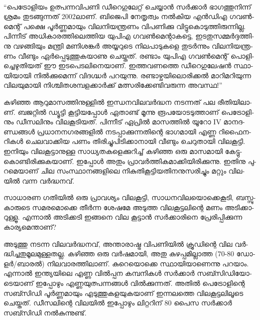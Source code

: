 \vskip 2pt

‌\begin{framed}
``പെ­ട്രോ­ളി­യം ഉത്പ­ന്ന­വി­പ­ണി ഡീ­റെ­ഗു­ലേ­റ്റ് ചെ­യ്യാന്‍ സര്‍­ക്കാര്‍ ഭാ­ഗ­ത്തു­നി­ന്ന് ശ്ര­മം തു­ട­ങ്ങു­ന്ന­ത് 2002­ലാ­ണ്. 
ബി­ജെ­പി നേ­തൃ­ത്വം നല്‍­കിയ എന്‍­ഡി­എ­ ഗവണ്‍­മെ­ന്റ് പക്ഷെ പൂര്‍­ണ്ണ­മാ­യും ­വി­ല­നി­യ­ന്ത്ര­ണം­ വി­പ­ണി­ക്കു 
വി­ട്ടു­കൊ­ടു­ത്തി­രു­ന്നി­ല്ല. പി­ന്നീ­ട് അധി­കാ­ര­ത്തി­ലെ­ത്തിയ ­യു­പി­എ­ ഗവണ്‍­മെ­ന്റാ­ക­ട്ടെ, ഇട­തു­സ­മ്മര്‍­ദ്ദ­ത്തി­നു വഴ­ങ്ങി­യും 
മന്ത്രി മണി­ശ­ങ്കര്‍ അയ്യ­റു­ടെ നി­ല­പാ­ടു­ക­ളെ തു­ടര്‍­ന്നും വി­ല­നി­യ­ന്ത്ര­ണം വീ­ണ്ടും ഏര്‍­പ്പെ­ടു­ത്തു­ക­യാ­ണു ചെ­യ്ത­ത്. രണ്ടാം 
യു­പിഎ ഗവണ്‍­മെ­ന്റ് പൊ­ളി­ച്ചെ­ഴു­തി­യ­ത് ഈ ഇട­പെ­ട­ലി­നെ­യാ­ണ്. ഇത്ത­വ­ണ­ത്തെ ഡീ­റെ­ഗു­ലേ­ഷന്‍ സ്ഥാ­യി­യാ­യി
നില്‍­ക്കു­മെ­ന്ന് വി­ദ­ഗ്ദ്ധര്‍ പറ­യു­ന്നു. രണ്ടാ­ഴ്ച­യി­ലൊ­രി­ക്കല്‍ മാ­റി­മ­റി­യു­ന്ന വി­ല­യു­മാ­യി നി­ശ്ചി­ത­ശ­മ്പ­ള­ക്കാര്‍­ക്ക് 
മത്സ­രി­ക്കേ­ണ്ടി­വ­രു­ന്ന അവ­സ്ഥ!''
\end{framed}

{\vskip 12pt}


­ക­ഴി­ഞ്ഞ ആറു­മാ­സ­ത്തി­നു­ള്ളില്‍ ഇന്ധ­ന­വി­ല­വര്‍­ദ്ധന നട­ന്ന­ത് പല രീ­തി­യി­ലാ­ണ്. ബജ­റ്റില്‍ ഡ്യൂ­ട്ടി കൂ­ട്ടി­യ­പ്പോള്‍ 
ഏതാ­ണ്ട് മൂ­ന്നു രൂ­പ­യോ­ട­ടു­ത്താ­ണ് പെ­ട്രോ­ളി­നും ഡീ­സ­ലി­നും വി­ല­കൂ­ടി­യ­ത്. പി­ന്നീ­ട് ഏപ്രില്‍ മാ­സ­ത്തില്‍ യൂ­റോ IV 
മാ­ന­ദ­ണ്ഡ­ങ്ങള്‍ പ്ര­ധാ­ന­ന­ഗ­ര­ങ്ങ­ളില്‍ നട­പ്പാ­ക്കു­ന്ന­തി­ന്റെ ഭാ­ഗ­മാ­യി എണ്ണ റി­ഫൈ­ന­റി­കള്‍ ചെ­ല­വാ­ക്കിയ പണം 
തി­രി­ച്ചു­പി­ടി­ക്കാ­നാ­യി വീ­ണ്ടും ചെ­റു­താ­യി വി­ല­കൂ­ട്ടി. ഇനി­യും വി­ല­കൂ­ട്ടാ­നു­ള്ള സാ­ധ്യ­ത­ക­ളെ­ക്കു­റി­ച്ച് കഴി­ഞ്ഞ ഒരു മാ­സ­മാ­യി
കേ­ട്ടു­കൊ­ണ്ടി­രി­ക്കു­ക­യാ­ണ്. ഇപ്പോള്‍ അതും പ്രാ­വര്‍­ത്തി­ക­മാ­ക്കി­യി­രി­ക്കു­ന്നു. ഇതി­നു പു­റ­മെ­യാ­ണ് ചില സം­സ്ഥാ­ന­ങ്ങ­ളി­ലെ
നി­കു­തി­കൂ­ട്ടി­യ­തി­ന­നു­സ­രി­ച്ചും മറ്റും വി­ല­യില്‍ വന്ന വര്‍­ദ്ധ­ന­വ്.

­സാ­ധാ­രണ ഗതി­യില്‍ ഒരു പ്രാ­വ­ശ്യം വി­ല­കൂ­ട്ടി, സാ­ധ­ന­വി­ല­യൊ­ക്കെ­കൂ­ടി, ബസ്സു­കാ­രു­ടെ സമ­ര­മൊ­ക്കെ തീര്‍­ന്ന 
ശേ­ഷ­മേ അടു­ത്ത വി­ല­കൂ­ട്ട­ലി­ന്റെ മണം അടി­ക്കാ­റു­ള്ളൂ. എന്നാല്‍ അടി­ക്ക­ടി ഇങ്ങ­നെ വില കൂ­ട്ടാന്‍ സര്‍­ക്കാ­രി­നെ 
പ്രേ­രി­പ്പി­ക്കു­ന്ന കാ­ര്യ­മെ­ന്താ­ണ്?

അ­ടു­ത്തു നട­ന്ന വി­ല­വര്‍­ദ്ധ­ന­വ്, അന്താ­രാ­ഷ്ട്ര വി­പ­ണി­യില്‍ ക്രൂ­ഡി­ന്റെ വില വര്‍­ദ്ധി­ച്ച­തു­മൂ­ല­മു­ള്ള­ത­ല്ല. കഴി­ഞ്ഞ ഒരു 
വര്‍­ഷ­മാ­യി, അതു കു­ഴ­പ്പ­മി­ല്ലാ­ത്ത (70-80 ഡോ­ളര്‍/­ബാ­രല്‍) നി­ല­വാ­ര­ത്തി­ലാ­ണ്. കു­റെ­യൊ­ക്കെ സ്ഥാ­യി­യാ­ണെ­ന്നു
പറ­യാം. എന്നാല്‍ ഇന്ത്യ­യി­ലെ എണ്ണ വില്‍­പ്പന കമ്പ­നി­കള്‍ സര്‍­ക്കാര്‍ സബ്സി­ഡി­യോ­ടെ­യാ­ണ് ഇപ്പോ­ഴും 
എണ്ണ­യു­ത്പ­ന്ന­ങ്ങള്‍ വില്‍­ക്കു­ന്ന­ത്. അതില്‍ പെ­ട്രോ­ളി­ന്റെ സബ്സി­ഡി പൂര്‍­ണ്ണ­മാ­യും എടു­ത്തു­ക­ള­യു­ക­യാ­ണ് 
ഇന്ന­ല­ത്തെ വി­ല­കൂ­ട്ട­ലി­ലൂ­ടെ ചെ­യ്ത­ത്. ഡീ­സ­ലി­ന്റെ വി­ല­യില്‍ ഇപ്പോ­ഴും ലി­റ്റ­റി­ന് 80 പൈസ സര്‍­ക്കാര്‍ 
സബ്സി­ഡി നല്‍­കു­ന്നു­ണ്ട്.

